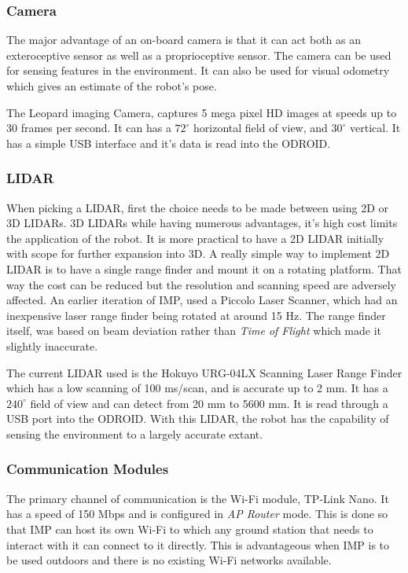\subsubsection{Camera}

The major advantage of an on-board camera is that it can act both as an exteroceptive sensor as well as a proprioceptive sensor. The camera can be used for sensing features in the environment. It can also be used for visual odometry which gives an estimate of the robot's pose.

The Leopard imaging Camera, captures 5 mega pixel HD images at speeds up to 30 frames per second. It can has a $ 72^\circ $ horizontal field of view, and $ 30^\circ $ vertical. It has a simple USB interface and it's data is read into the ODROID.

\subsubsection{LIDAR}
When picking a LIDAR, first the choice needs to be made between using 2D or 3D LIDARs. 3D LIDARs while having numerous advantages, it's high cost limits the application of the robot. It is more practical to have a 2D LIDAR initially with scope for further expansion into 3D. A really simple way to implement 2D LIDAR is to have a single range finder and mount it on a rotating platform. That way the cost can be reduced but the resolution and scanning speed are adversely affected. An earlier iteration of IMP, used a Piccolo Laser Scanner, which had an inexpensive laser range finder being rotated at around 15 Hz. The range finder itself, was based on beam deviation rather than \textit{Time of Flight} which made it slightly inaccurate. 

The current LIDAR used is the Hokuyo URG-04LX Scanning Laser Range Finder which has a low scanning of 100 ms/scan, and is accurate up to 2 mm. It has a $ 240^\circ $ field of view and can detect from 20 mm to 5600 mm. It is read through a USB port into the ODROID. With this LIDAR, the robot has the capability of sensing the environment to a largely accurate extant.

\subsubsection{Communication Modules}
The primary channel of communication is the Wi-Fi module, TP-Link Nano. It has a speed of 150 Mbps and is configured in \textit{AP Router} mode. This is done so that IMP can host its own Wi-Fi to which any ground station that needs to interact with it can connect to it directly. This is advantageous when IMP is to be used outdoors and there is no existing Wi-Fi networks available. 

